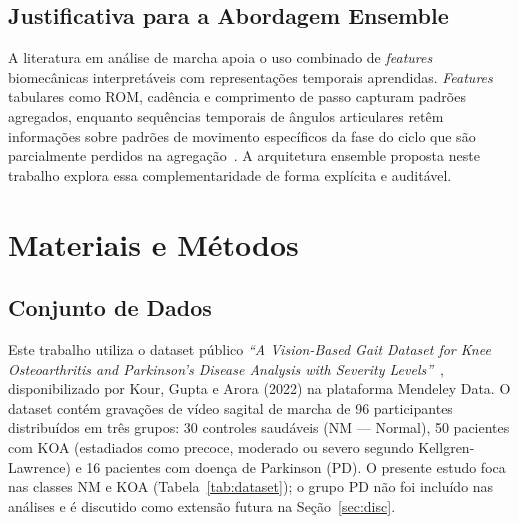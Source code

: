 \documentclass[a4paper,12pt]{article}
\begin{document}
\subsection{Justificativa para a Abordagem Ensemble}

A literatura em análise de marcha apoia o uso combinado de \textit{features}
biomecânicas interpretáveis com representações temporais aprendidas.
\textit{Features} tabulares como ROM, cadência e comprimento de passo capturam
padrões agregados, enquanto sequências temporais de ângulos articulares retêm
informações sobre padrões de movimento específicos da fase do ciclo que são
parcialmente perdidos na agregação~\cite{Stenum2021,Kaya2025}. A arquitetura
ensemble proposta neste trabalho explora essa complementaridade de forma explícita
e auditável.

\section{Materiais e Métodos}

\subsection{Conjunto de Dados}

Este trabalho utiliza o dataset público \textit{``A Vision-Based Gait Dataset for
Knee Osteoarthritis and Parkinson's Disease Analysis with Severity
Levels''}~\cite{Kour2022}, disponibilizado por Kour, Gupta e Arora (2022) na
plataforma Mendeley Data. O dataset contém gravações de vídeo sagital de marcha de
96 participantes distribuídos em três grupos: 30 controles saudáveis
(NM --- Normal), 50 pacientes com KOA (estadiados como precoce, moderado ou severo
segundo Kellgren-Lawrence) e 16 pacientes com doença de Parkinson (PD). O presente
estudo foca nas classes NM e KOA (Tabela~\ref{tab:dataset}); o grupo PD não foi
incluído nas análises e é discutido como extensão futura na Seção~\ref{sec:disc}.
\end{document}
